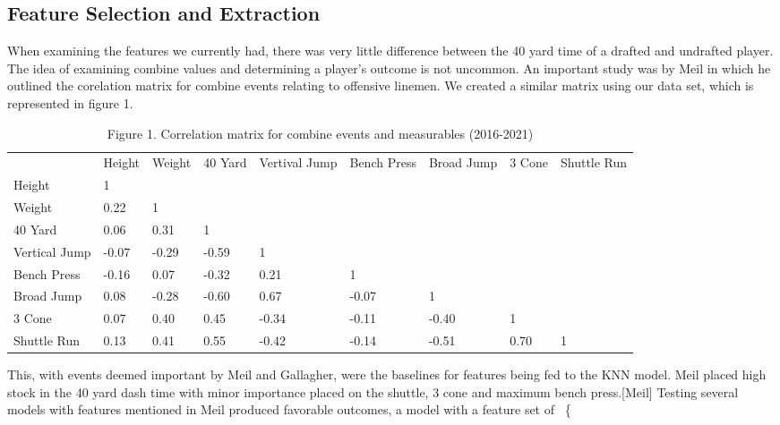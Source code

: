 \documentclass[confrence]{IEEEtran}
\begin{document}
\subsection*{Feature Selection and Extraction}
When examining the features we currently had, there was very little difference between the 40 yard time of a drafted and undrafted player. 
The idea of examining combine values and determining a player's outcome is not uncommon. 
An important study was by Meil in which he outlined the corelation matrix for combine events relating to offensive linemen.
We created a similar matrix using our data set, which is represented in figure 1. 
\begin{table*}[htbp]
\begin{tabular}{lllllllll}
              & Height & Weight & 40 Yard & Vertival Jump & Bench Press & Broad Jump & 3 Cone & Shuttle Run \\
Height        & 1      &        &         &               &             &            &        &             \\
Weight        & 0.22   & 1      &         &               &             &            &        &             \\
40 Yard       & 0.06   & 0.31   & 1       &               &             &            &        &             \\
Vertical Jump & -0.07  & -0.29  & -0.59   & 1             &             &            &        &             \\
Bench Press   & -0.16  & 0.07   & -0.32   & 0.21          & 1           &            &        &             \\
Broad Jump    & 0.08   & -0.28  & -0.60   & 0.67          & -0.07       & 1          &        &             \\
3 Cone        & 0.07   & 0.40   & 0.45    & -0.34         & -0.11       & -0.40      & 1      &             \\
Shuttle Run   & 0.13   & 0.41   & 0.55    & -0.42         & -0.14       & -0.51      & 0.70   & 1          
\end{tabular}
\caption*{Figure 1. Correlation matrix for combine events and measurables (2016-2021)}
\end{table*}
This, with events deemed important by Meil and Gallagher, were the baselines for features being fed to the KNN model.
Meil placed high stock in the 40 yard dash time with minor importance placed on the shuttle, 3 cone and maximum bench press.[Meil]
Testing several models with features mentioned in Meil produced favorable outcomes, a model with a feature set of  \{
\end{document}
